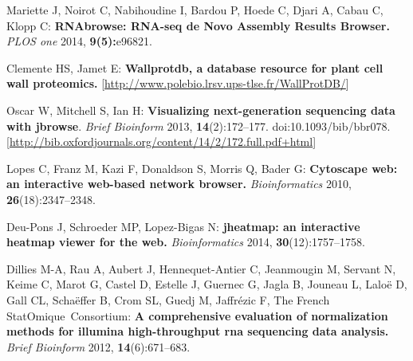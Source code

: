\documentclass[11pt]{bmc_article_s50}
\begin{document}
\begin{thebibliography}{18}
Mariette J,
Noirot C,
Nabihoudine I,
Bardou P,
Hoede C,
Djari A,
Cabau C,
Klopp C:
\textbf{RNAbrowse: RNA-seq de Novo Assembly Results Browser.}
\textit{PLOS one} 2014,
\textbf{9(5):}{e96821}.


Clemente HS,
Jamet E:
\textbf{Wallprotdb, a database resource for plant cell wall proteomics.}
{[\url{http://www.polebio.lrsv.ups-tlse.fr/WallProtDB/}]}


Oscar W,
Mitchell S,
Ian H:
\textbf{Visualizing next-generation sequencing data with jbrowse}.
\textit{Brief Bioinform} 2013,
\textbf{14}(2):{172}--{177}.
doi:{10.1093/bib/bbr078}.
{[\url{http://bib.oxfordjournals.org/content/14/2/172.full.pdf+html}]}



Lopes C,
Franz M,
Kazi F,
Donaldson S,
Morris Q,
Bader G:
\textbf{Cytoscape web: an interactive web-based network browser.}
\textit{Bioinformatics} 2010,
\textbf{26}(18):{2347}--{2348}.



Deu-Pons J,
Schroeder MP,
Lopez-Bigas N:
\textbf{jheatmap: an interactive heatmap viewer for the web.}
\textit{Bioinformatics} 2014,
\textbf{30}(12):{1757}--{1758}.



Dillies M-A,
Rau A,
Aubert J,
Hennequet-Antier C,
Jeanmougin M,
Servant N,
Keime C,
Marot G,
Castel D,
Estelle J,
Guernec G,
Jagla B,
Jouneau L,
Lalo\"{e} D,
Gall CL,
Scha\"{e}ffer B,
Crom SL,
Guedj M,
Jaffr\'{e}zic F,
{The French StatOmique~Consortium}:
\textbf{A comprehensive evaluation of normalization methods for illumina
high-throughput rna sequencing data analysis.}
\textit{Brief Bioinform} 2012,
\textbf{14}(6):{671}--{683}.
 

\end{thebibliography}
\end{document}
